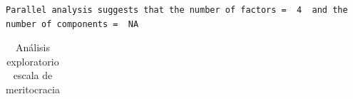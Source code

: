 \documentclass[
  12pt,
]{article}
\begin{document}
\begin{verbatim}
Parallel analysis suggests that the number of factors =  4  and the number of components =  NA 
\end{verbatim}

\begin{longtable}[]{@{}
  >{\raggedright\arraybackslash}p{}
  >{\raggedright\arraybackslash}p{}
  >{\raggedright\arraybackslash}p{}
  >{\raggedright\arraybackslash}p{}
  >{\raggedright\arraybackslash}p{}
  >{\raggedright\arraybackslash}p{}@{}}

\caption{\label{tbl-exploratorio}Análisis exploratorio escala de
meritocracia}

\tabularnewline


\end{longtable}
\end{document}

